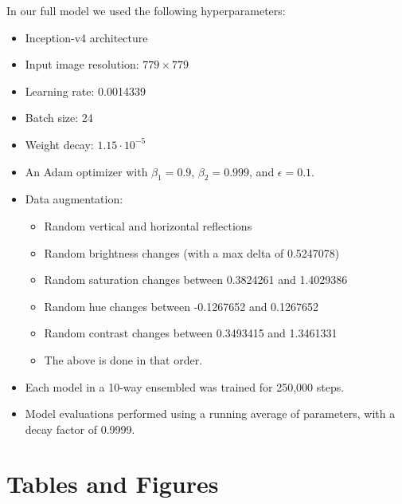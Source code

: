 \documentclass{llncs}
\begin{document}
\noindent
In our full model we used the following hyperparameters:
\begin{itemize}
  \item Inception-v4 architecture
  \item Input image resolution: $779 \times 779$
  \item Learning rate: 0.0014339
  \item Batch size: 24
  \item Weight decay: $1.15 \cdot 10^{-5}$
  \item An Adam optimizer with $\beta_1 = 0.9$, $\beta_2 = 0.999$, and $\epsilon = 0.1$.
  \item Data augmentation:
    \begin{itemize}
      \item Random vertical and horizontal reflections
      \item Random brightness changes (with a max delta of 0.5247078)
      \item Random saturation changes between 0.3824261 and 1.4029386
      \item Random hue changes between -0.1267652 and 0.1267652
      \item Random contrast changes between 0.3493415 and 1.3461331
      \item The above is done in that order.
    \end{itemize}
  \item Each model in a 10-way ensembled was trained for 250,000 steps.
  \item Model evaluations performed using a running average of parameters, with a decay factor of 0.9999.
\end{itemize}



\newpage
\section*{Tables and Figures}
\end{document}
